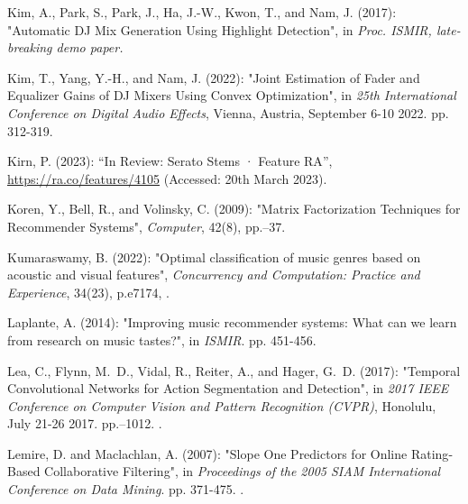 \documentclass[11pt,titlepage,oneside]{book}
\begin{document}
\begin{thebibliography}{97}
	Kim, A., Park, S., Park, J., Ha, J.-W., Kwon, T., and Nam, J. (2017):
	"Automatic {DJ} {Mix} {Generation} {Using} {Highlight} {Detection}", in \textit{Proc. ISMIR, late-breaking demo paper.}
	
	Kim, T., Yang, Y.-H., and Nam, J. (2022): "Joint {Estimation} of
		{Fader} and {Equalizer} {Gains} of {DJ} {Mixers} {Using} {Convex}
		{Optimization}", in \textit{25th International Conference on Digital Audio Effects}, Vienna, Austria, September 6-10 2022. pp. 312-319.
	
	Kirn, P. (2023): \enquote{In {Review}: {Serato} {Stems} · {Feature} {RA}},
	\urlprefix\url{https://ra.co/features/4105} (Accessed: 20th March 2023).
	
	Koren, Y., Bell, R., and Volinsky, C. (2009): "Matrix {Factorization}
		{Techniques} for {Recommender} {Systems}", \textit{Computer}, 42(8),
	pp.--37. 
	
	Kumaraswamy, B. (2022): "Optimal classification of music genres based
		on acoustic and visual features", \textit{Concurrency and Computation:
		Practice and Experience}, 34(23), p.\ignorespaces e7174,
	. 
	
	Laplante, A. (2014): "Improving music recommender systems: What can we learn from research on music tastes?", in \textit{ISMIR}. pp. 451-456.
	
	Lea, C., Flynn, M.~D., Vidal, R., Reiter, A., and Hager, G.~D. (2017):
	"Temporal {Convolutional} {Networks} for {Action} {Segmentation} and
		{Detection}", in \textit{2017 {IEEE} {Conference} on {Computer} {Vision} and
		{Pattern} {Recognition} ({CVPR})}, Honolulu, July 21-26 2017. pp.--1012. .
	
	Lemire, D. and Maclachlan, A. (2007): "Slope {One} {Predictors} for
		{Online} {Rating}-{Based} {Collaborative} {Filtering}", in \textit{Proceedings
		of the 2005 SIAM International Conference on Data Mining}. pp. 371-475.
	.
	

\end{thebibliography}
\end{document}
